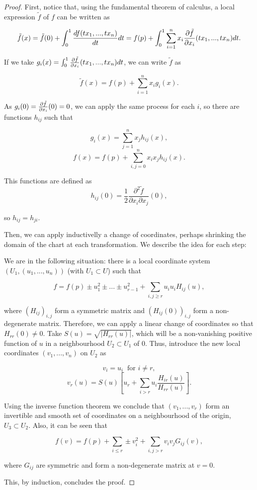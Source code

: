 \begin{proof} First, notice that, using the fundamental theorem of calculus, a local expression $\tilde{f}$ of $f$ can be written as

$$\tilde{f}(x) = \tilde{f}(0) + \int_0^1 \frac{df(tx_1,...,tx_n)}{dt} dt = f(p) + \int_0^1 \sum_{i=1}^n x_i \frac{\partial \tilde{f}}{\partial x_i}(tx_1,...,tx_n) dt .$$

If we take $g_i(x) = \int_0^1 \frac{\partial \tilde{f}}{\partial x_i}(tx_1,...,tx_n) dt$, we can write $\tilde{f}$ as

$$\tilde{f}(x) = f(p) + \sum_{i=1}^n x_i g_i(x) .$$

As $g_i(0) = \frac{\partial \tilde{f}}{\partial x_i}(0) = 0$, we can apply the same process for each $i$, so there are functions $h_{ij}$ such that

$$g_i(x) = \sum_{j=1}^n x_j h_{ij}(x) ,$$
$$f(x) = f(p) + \sum_{i,j=0}^n x_i x_j h_{ij}(x) .$$

This functions are defined as
$$h_{ij}(0) = \frac12 \frac{\partial^2 \tilde{f}}{\partial x_i \partial x_j}(0) ,$$

so $h_{ij} = h_{ji}$.

Then, we can apply inductivelly a change of coordinates, perhaps shrinking the domain of the chart at each transformation. We describe the idea for each step:

We are in the following situation: there is a local coordinate system $(U_1, (u_1,...,u_n))$ (with $U_1 \subset U$) such that

$$f = f(p) \pm u_1^2 \pm ... \pm u_{r-1}^2 + \sum_{i,j \geq r} u_i u_i H_{ij}(u) ,$$

where $(H_{ij})_{i,j}$ form a symmetric matrix and $(H_{ij}(0))_{i,j}$ form a non-degenerate matrix. Therefore, we can apply a linear change of coordinates so that $H_{rr}(0) \neq 0$. Take $S(u) = \sqrt{|H_{rr}(u)|}$, which will be a non-vanishing positive function of $u$ in a neighbourhood $U_2 \subset U_1$ of $0$. Thus, introduce the new local coordinates $(v_1,...,v_n)$ on $U_2$ as

$$v_i = u_i \ \text{ for } i \neq r,$$
$$v_r(u) = S(u) \left[ u_r + \sum_{i > r} u_i \frac{H_{ir}(u)}{H_{rr}(u)} \right] .$$

Using the inverse function theorem we conclude that $(v_1,...,v_r)$ form an invertible and smooth set of coordinates on a neighbourhood of the origin, $U_3 \subset U_2$. Also, it can be seen that

$$f(v) = f(p) + \sum_{i \leq r} \pm v_i^2 + \sum_{i,j > r} v_i v_j G_{ij}(v) ,$$

where $G_{ij}$ are symmetric and form a non-degenerate matrix at $v = 0$.

This, by induction, concludes the proof.
\end{proof}

